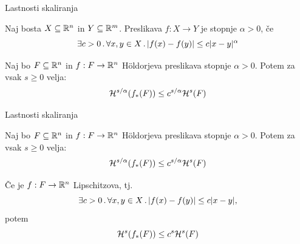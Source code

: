 \documentclass[10pt]{beamer}
\begin{document}

\begin{frame}[t]{Lastnosti skaliranja}
    \begin{definicija} Naj bosta \(X \subseteq \mathbb{R}^n\) in \(Y \subseteq \mathbb{R}^m\).
        Preslikava \(f: X \to Y\) je  stopnje \(\alpha > 0\), če
        \[\exists c > 0 \,.\, \forall x, y \in X \,.\, |f(x) -f(y)| \leq c|x-y|^\alpha\]             
    \end{definicija}  
    \pause
    \begin{trditev}
        Naj bo \(F \subseteq \mathbb{R}^n\) in \(f: F \to \mathbb{R}^n\) Höldorjeva preslikava stopnje \(\alpha > 0\). Potem za vsak \(s \geq 0\) velja:
        \[\mathcal{H}^{s/\alpha}(f_{*}(F)) \leq c^{s/\alpha} \mathcal{H}^s(F)\]
    \end{trditev}
\end{frame}

\begin{frame}[t]{Lastnosti skaliranja}
    \begin{trditev}
        Naj bo \(F \subseteq \mathbb{R}^n\) in \(f: F \to \mathbb{R}^n\) Höldorjeva preslikava stopnje \(\alpha > 0\). Potem za vsak \(s \geq 0\) velja:
        \[\mathcal{H}^{s/\alpha}(f_{*}(F)) \leq c^{s/\alpha} \mathcal{H}^s(F)\]
    \end{trditev}

    \begin{posledica}
        Če je \(f: F \to \mathbb{R}^n\) Lipschitzova, tj.
        \[\exists c > 0 \,.\, \forall x, y \in X \,.\, |f(x) -f(y)| \leq c|x-y|,\]
        potem
        \[\mathcal{H}^{s}(f_{*}(F)) \leq c^{s} \mathcal{H}^s(F)\]
    \end{posledica}
\end{frame}
\end{document}
